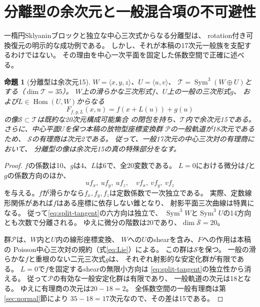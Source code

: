 \documentclass[11pt,a4paper]{ltjsarticle}
\numberwithin{equation}{section}
\newtheorem{proposition}[theorem]{命題}
\newcommand{\Sym}{\operatorname{Sym}}
\newcommand{\Hom}{\operatorname{Hom}}
\begin{document}
\section{分離型の余次元と一般混合項の不可避性}
\label{sec:split-codimension}
一楕円Sklyaninブロックと独立な中心三次式からなる分離型は、
rotation付き可換復元の明示的な成功例である。
しかし、それが本稿の17次元一般族を支配するわけではない。
その理由を中心一次平面を固定した係数空間で正確に述べる。

\begin{proposition}[分離型は余次元15]
\label{prop:split-codimension}
$W=\langle x,y,z\rangle$、$U=\langle u,v\rangle$、
$\mathcal T=\Sym^3(W\oplus U)$とする（$\dim\mathcal T=35$）。
$W$上の滑らかな三次形式$f$、$U$上の一般の三次形式$g$、
および$L\in\Hom(U,W)$からなる
\[
 F_{f,g,L}(x,u)=f(x+L(u))+g(u)
 \tag{S}\label{eq:split-family}
\]
の像$\mathcal S\subset\mathcal T$は既約な20次元構成可能集合
の閉包を持ち、$\mathcal T$内で余次元15である。
さらに、中心平面$U$を保つ本稿の放物型座標変換群
$\mathcal P$の一般軌道が18次元であるため、
$\mathcal S$の有理商は次元2である。
従って、一般17次元の中心三次対の有理商において、
分離型の像は余次元15の真の特殊部分をなす。
\end{proposition}
\begin{proof}
$f$の係数は10、$g$は4、$L$は6で、全20変数である。
$L=0$における微分は$f$と$g$の係数方向のほか、
\[
 u f_x,\ u f_y,\ u f_z,\quad
 v f_x,\ v f_y,\ v f_z
 \tag{T}\label{eq:split-tangent}
\]
を与える。$f$が滑らかなら$f_x,f_y,f_z$は定数係数で一次独立である。
実際、定数線形関係があれば$f$はある座標に依存しない錐となり、
射影平面三次曲線は特異になる。
従って\eqref{eq:split-tangent}の六方向は独立で、
$\Sym^3W$と$\Sym^3U$の14方向とも次数で分離される。
ゆえに微分の階数は20であり、$\dim\overline{\mathcal S}=20$。

群$\mathcal P$は、$W$内と$U$内の線形座標変換、
$W$への$U$のshearを含み、$F$への作用は本稿の
Poisson中心三次対の規約（式\eqref{eq:Lie}）による。
この群は$\mathcal S$を保つ。
一般の滑らかな$f$と重根のない二元三次式$g$は、
それぞれ射影的な安定化群が有限である。
$L=0$で$f$を固定するshearの無限小方向は
\eqref{eq:split-tangent}の独立性から消える。
従って$\mathcal P$の有効な一般安定化群は有限であり、
一般軌道の次元は18となる。
ゆえに有理商の次元は$20-18=2$。
全係数空間の一般有理商は第\ref{sec:normal}節により
$35-18=17$次元なので、その差は15である。
\end{proof}
\end{document}
